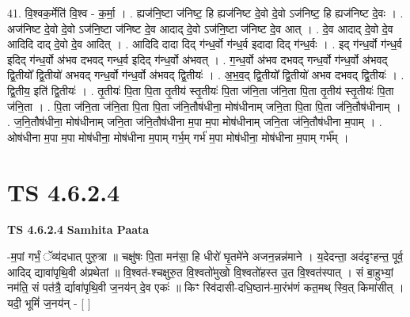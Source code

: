 \documentclass[17pt]{extarticle}
\begin{document}
41. वि॒श्वक॒र्मेति॑ वि॒श्व - क॒र्मा॒ । . ह्यज॑नि॒ष्टा ज॑निष्ट॒ हि ह्यज॑निष्ट दे॒वो दे॒वो ऽज॑निष्ट॒ हि ह्यज॑निष्ट दे॒वः । . अज॑निष्ट दे॒वो दे॒वो ऽज॑नि॒ष्टा ज॑निष्ट दे॒व आदाद् दे॒वो ऽज॑नि॒ष्टा ज॑निष्ट दे॒व आत् । . दे॒व आदाद् दे॒वो दे॒व आदिदि दाद् दे॒वो दे॒व आदित् । . आदिदि दादा दिद् ग॑न्ध॒र्वो ग॑न्ध॒र्व इदादा दिद् ग॑न्ध॒र्वः । . इद् ग॑न्ध॒र्वो ग॑न्ध॒र्व इदिद् ग॑न्ध॒र्वो अ॑भव दभवद् गन्ध॒र्व इदिद् ग॑न्ध॒र्वो अ॑भवत् । . ग॒न्ध॒र्वो अ॑भव दभवद् गन्ध॒र्वो ग॑न्ध॒र्वो अ॑भवद् द्वि॒तीयो᳚ द्वि॒तीयो॑ अभवद् गन्ध॒र्वो ग॑न्ध॒र्वो अ॑भवद् द्वि॒तीयः॑ । . अ॒भ॒व॒द् द्वि॒तीयो᳚ द्वि॒तीयो॑ अभव दभवद् द्वि॒तीयः॑ । . द्वि॒तीय॒ इति॑ द्वि॒तीयः॑ । . तृ॒तीयः॑ पि॒ता पि॒ता तृ॒तीय॑ स्तृ॒तीयः॑ पि॒ता ज॑नि॒ता ज॑नि॒ता पि॒ता तृ॒तीय॑ स्तृ॒तीयः॑ पि॒ता ज॑नि॒ता । . पि॒ता ज॑नि॒ता ज॑नि॒ता पि॒ता पि॒ता ज॑नि॒तौष॑धीना॒ मोष॑धीनाम् जनि॒ता पि॒ता पि॒ता ज॑नि॒तौष॑धीनाम् । . ज॒नि॒तौष॑धीना॒ मोष॑धीनाम् जनि॒ता ज॑नि॒तौष॑धीना म॒पा म॒पा मोष॑धीनाम् जनि॒ता ज॑नि॒तौष॑धीना म॒पाम् । . ओष॑धीना म॒पा म॒पा मोष॑धीना॒ मोष॑धीना म॒पाम् गर्भ॒म् गर्भ॑ म॒पा मोष॑धीना॒ मोष॑धीना म॒पाम् गर्भ᳚म् । \newline
\pagebreak
{}

\section{ TS 4.6.2.4 }

\textbf{TS 4.6.2.4 } \newline
\textbf{Samhita Paata} \newline

-म॒पां गर्भं॒ ॅव्य॑दधात् पुरु॒त्रा ॥ चक्षु॑षः पि॒ता मन॑सा॒ हि धीरो॑ घृ॒तमे॑ने अजन॒न्नन्न॑माने । य॒देदन्ता॒ अद॑दृꣳहन्त॒ पूर्व॒ आदिद् द्यावा॑पृथि॒वी अ॑प्रथेतां ॥ वि॒श्वत॑-श्चक्षुरु॒त वि॒श्वतो॑मुखो वि॒श्वतो॑हस्त उ॒त वि॒श्वत॑स्पात् । सं बा॒हुभ्यां॒ नम॑ति॒ सं पत॑त्रै॒ र्द्यावा॑पृथि॒वी ज॒नय॑न् दे॒व एकः॑ ॥ किꣳ स्वि॑दासी-दधि॒ष्ठान॑-मा॒रंभ॑णं कत॒मथ् स्वि॒त् किमा॑सीत् । यदी॒ भूमिं॑ ज॒नय॑न् - [  ] \newline
\end{document}
